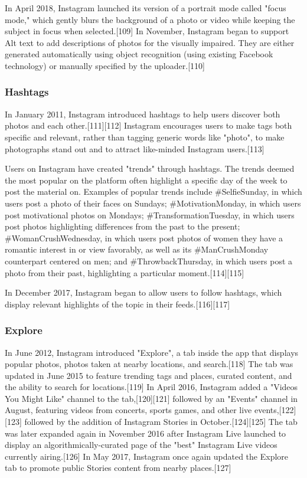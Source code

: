 \documentclass[12pt]{article}
\begin{document}
In April 2018, Instagram launched its version of a portrait mode called "focus mode," which gently blurs the background of a photo or video while keeping the subject in focus when selected.[109] In November, Instagram began to support Alt text to add descriptions of photos for the visually impaired. They are either generated automatically using object recognition (using existing Facebook technology) or manually specified by the uploader.[110] 






\subsubsection{Hashtags}

In January 2011, Instagram introduced hashtags to help users discover both photos and each other.[111][112] Instagram encourages users to make tags both specific and relevant, rather than tagging generic words like "photo", to make photographs stand out and to attract like-minded Instagram users.[113]

Users on Instagram have created "trends" through hashtags. The trends deemed the most popular on the platform often highlight a specific day of the week to post the material on. Examples of popular trends include \#SelfieSunday, in which users post a photo of their faces on Sundays; \#MotivationMonday, in which users post motivational photos on Mondays; \#TransformationTuesday, in which users post photos highlighting differences from the past to the present; \#WomanCrushWednesday, in which users post photos of women they have a romantic interest in or view favorably, as well as its \#ManCrushMonday counterpart centered on men; and \#ThrowbackThursday, in which users post a photo from their past, highlighting a particular moment.[114][115]

In December 2017, Instagram began to allow users to follow hashtags, which display relevant highlights of the topic in their feeds.[116][117] 




\subsubsection{Explore}


In June 2012, Instagram introduced "Explore", a tab inside the app that displays popular photos, photos taken at nearby locations, and search.[118] The tab was updated in June 2015 to feature trending tags and places, curated content, and the ability to search for locations.[119] In April 2016, Instagram added a "Videos You Might Like" channel to the tab,[120][121] followed by an "Events" channel in August, featuring videos from concerts, sports games, and other live events,[122][123] followed by the addition of Instagram Stories in October.[124][125] The tab was later expanded again in November 2016 after Instagram Live launched to display an algorithmically-curated page of the "best" Instagram Live videos currently airing.[126] In May 2017, Instagram once again updated the Explore tab to promote public Stories content from nearby places.[127]
\end{document}
